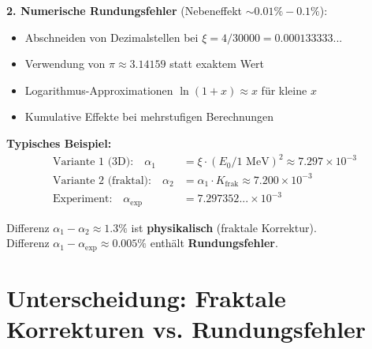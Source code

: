 		\textbf{2. Numerische Rundungsfehler} (Nebeneffekt $\sim 0.01\% - 0.1\%$):
		\begin{itemize}
			\item Abschneiden von Dezimalstellen bei $\xi = 4/30000 = 0.000133333...$
			\item Verwendung von $\pi \approx 3.14159$ statt exaktem Wert
			\item Logarithmus-Approximationen $\ln(1+x) \approx x$ für kleine $x$
			\item Kumulative Effekte bei mehrstufigen Berechnungen
		\end{itemize}
		
		\textbf{Typisches Beispiel:}
		\begin{align}
			\text{Variante 1 (3D):} \quad \alpha_1 &= \xi \cdot (E_0/1\text{ MeV})^2 \approx 7.297 \times 10^{-3} \\
			\text{Variante 2 (fraktal):} \quad \alpha_2 &= \alpha_1 \cdot K_{\text{frak}} \approx 7.200 \times 10^{-3} \\
			\text{Experiment:} \quad \alpha_{\text{exp}} &= 7.297352... \times 10^{-3}
		\end{align}
		
		Differenz $\alpha_1 - \alpha_2 \approx 1.3\%$ ist \textbf{physikalisch} (fraktale Korrektur).\\
		Differenz $\alpha_1 - \alpha_{\text{exp}} \approx 0.005\%$ enthält \textbf{Rundungsfehler}.

	
	\section{Unterscheidung: Fraktale Korrekturen vs. Rundungsfehler}
	
